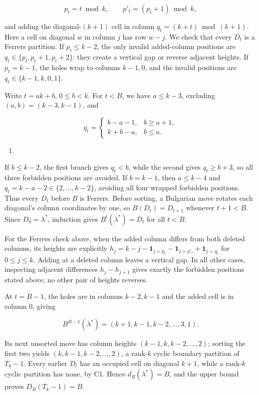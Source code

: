 \documentclass[11pt,a4paper]{article}
\providecommand{\tightlist}{\setlength{\itemsep}{0pt}\setlength{\parskip}{0pt}}
\begin{document}
\[
p_t=t\bmod k,\qquad p'_t=(p_t+1)\bmod k,
\]

and adding the diagonal-\((k+1)\) cell in column \(q_t=(k+t)\bmod(k+1)\). Here a cell on diagonal \(w\) in column \(j\) has row \(w-j\). We check that every \(D_t\) is a Ferrers partition. If \(p_t\le k-2\), the only invalid added-column positions are \(q_t\in\{p_t,p_t+1,p_t+2\}\): they create a vertical gap or reverse adjacent heights. If \(p_t=k-1\), the holes wrap to columns \(k-1,0\), and the invalid positions are \(q_t\in\{k-1,k,0,1\}\).

Write \(t=ak+b\), \(0\le b<k\). For \(t<B\), we have \(a\le k-3\), excluding \((a,b)=(k-3,k-1)\), and

\[
q_t=\begin{cases}
b-a-1,&b\ge a+1,\\
k+b-a,&b\le a.
\end{cases}
\]

\begin{enumerate}
\def\labelenumi{(\Alph{enumi})}
\setcounter{enumi}{6}
\tightlist
\item
\end{enumerate}

If \(b\le k-2\), the first branch gives \(q_t<b\), while the second gives \(q_t\ge b+3\), so all three forbidden positions are avoided. If \(b=k-1\), then \(a\le k-4\) and \(q_t=k-a-2\in\{2,\ldots,k-2\}\), avoiding all four wrapped forbidden positions. Thus every \(D_t\) before \(B\) is Ferrers. Before sorting, a Bulgarian move rotates each diagonal's column coordinates by one, so \(B(D_t)=D_{t+1}\) whenever \(t+1<B\). Since \(D_0=\lambda^*\), induction gives \(B^t(\lambda^*)=D_t\) for all \(t<B\).

For the Ferrers check above, when the added column differs from both deleted columns, its heights are explicitly \(h_j=k-j-\mathbf1_{j=p_t}-\mathbf1_{j=p'_t}+\mathbf1_{j=q_t}\) for \(0\le j\le k\). Adding at a deleted column leaves a vertical gap. In all other cases, inspecting adjacent differences \(h_j-h_{j+1}\) gives exactly the forbidden positions stated above; no other pair of heights reverses.

At \(t=B-1\), the holes are in columns \(k-2,k-1\) and the added cell is in column \(0\), giving

\[
B^{B-1}(\lambda^*)=(k+1,k-1,k-2,\ldots,3,1).
\]

Its next unsorted move has column heights \((k-1,k,k-2,\ldots,2)\); sorting the first two yields \((k,k-1,k-2,\ldots,2)\), a rank-\(k\) cyclic boundary partition of \(T_k-1\). Every earlier \(D_t\) has an occupied cell on diagonal \(k+1\), while a rank-\(k\) cyclic partition has none, by C1. Hence \(d_B(\lambda^*)=B\), and the upper bound proves \(D_B(T_k-1)=B\).
\end{document}
